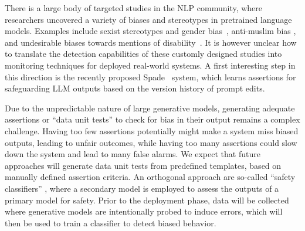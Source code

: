  There is a large body of targeted studies in the NLP community, where researchers uncovered a variety of biases and stereotypes in pretrained language models. Examples include sexist stereotypes and gender bias~\cite{lucy2021gender,sheng2019woman}, anti-muslim bias \cite{abid2021persistent}, and undesirable biases towards mentions of disability~\cite{hutchinson2020social}. It is however unclear how to translate the detection capabilities of these customly designed studies into monitoring techniques for deployed real-world systems. A first interesting step in this direction is the recently proposed Spade~\cite{shankar2024spade} system, which learns assertions for safeguarding LLM outputs based on the version history of prompt edits. 

 Due to the unpredictable nature of large generative models, generating adequate assertions or ``data unit tests'' to check for bias in their output remains a complex challenge. Having too few assertions potentially might make a system miss biased outputs, leading to unfair outcomes, while having too many assertions could slow down the system and lead to many false alarms. We expect that future approaches will generate data unit tests from predefined templates, based on manually defined assertion criteria. An orthogonal approach are so-called ``safety classifiers'' \cite{xu2021bot, dinan2022safetykit,markov2023holistic}, where a secondary model is employed to assess the outputs of a primary model for safety. Prior to the deployment phase, data will be collected where generative models are intentionally probed to induce errors, which will then be used to train a classifier to detect biased behavior.


